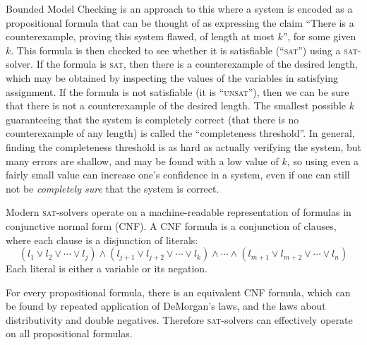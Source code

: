 \documentclass[11pt]{article}
\newcommand{\sat}{\textsc{sat}}
\newcommand{\unsat}{\textsc{unsat}}
\begin{document}
Bounded Model Checking is an approach to this where a system is encoded as a propositional formula that can be thought of as expressing the claim ``There is a counterexample, proving this system flawed, of length at most $k$'', for some given $k$. This formula is then checked to see whether it is satisfiable (``\sat'') using a \sat{}-solver. If the formula is \sat, then there is a counterexample of the desired length, which may be obtained by inspecting the values of the variables in satisfying assignment. If the formula is not satisfiable (it is ``\unsat''), then we can be sure that there is not a counterexample of the desired length. The smallest possible $k$ guaranteeing that the system is completely correct (that there is no counterexample of any length) is called the ``completeness threshold''. In general, finding the completeness threshold is as hard as actually verifying the system, but many errors are shallow, and may be found with a low value of $k$, so using even a fairly small value can increase one's confidence in a system, even if one can still not be \emph{completely sure} that the system is correct.

Modern \sat{}-solvers operate on a machine-readable representation of formulas in conjunctive normal form (CNF). A CNF formula is a conjunction of clauses, where each clause is a disjunction of literals:
$$(l_1 \vee l_2 \vee \cdots \vee l_j) \wedge (l_{j+1} \vee l_{j+2} \vee \cdots \vee l_k) \wedge \cdots \wedge (l_{m+1} \vee l_{m+2} \vee \cdots \vee l_n)$$
Each literal is either a variable or its negation.

For every propositional formula, there is an equivalent CNF formula, which can be found by repeated application of DeMorgan's laws, and the laws about distributivity and double negatives. Therefore \sat{}-solvers can effectively operate on all propositional formulas.
\end{document}
